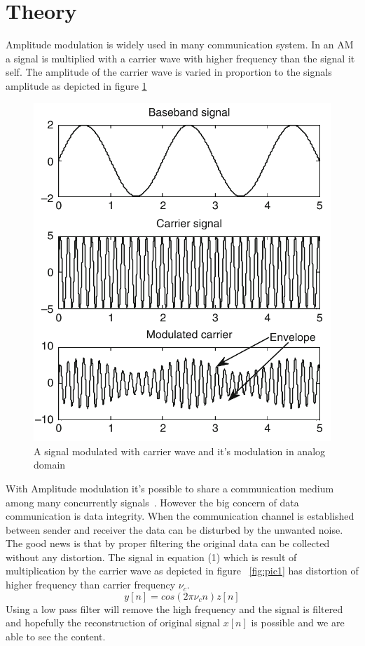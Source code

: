 \documentclass[a4paper,twocolumn]{article}
\begin{document}
\section{Theory}
Amplitude modulation is widely used in many communication system. In an AM a signal is multiplied  with a carrier wave with higher frequency than the signal it self. The amplitude of the carrier wave is varied in proportion to the signals amplitude as depicted in figure \ref{fig:am}
\begin{figure}[H]
  \begin{center}
    \includegraphics[width=0.83\columnwidth]{am2.png}
  \end{center}
  \caption{A signal modulated with carrier wave and it's modulation in analog domain~\cite{book2}}
  \label{fig:am}
\end{figure}
\noindent
With Amplitude modulation it's possible to share a communication medium among many concurrently signals~\cite{mit}.
However the big concern of data communication is data integrity. When the communication channel is established between sender and receiver the data can be disturbed by the unwanted noise. The good news is that by proper filtering the original data can be collected without any distortion.
The signal in equation (1) which is result of multiplication by the carrier wave as depicted in figure ~\ref{fig:pic1} has distortion of higher frequency than carrier frequency $\nu_c$.
\begin{equation}
y[n] = cos(2\pi \nu_cn)z[n]
\end{equation}
Using a low pass filter will remove the high frequency and the signal is filtered and hopefully the reconstruction of original signal $x[n]$ is possible and we are able to see the content.
\end{document}
